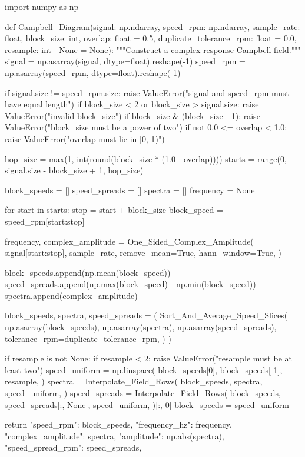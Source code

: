 \begin{python}
import numpy as np


def Campbell_Diagram(signal: np.ndarray,
                      speed_rpm: np.ndarray,
                      sample_rate: float,
                      block_size: int,
                      overlap: float = 0.5,
                      duplicate_tolerance_rpm: float = 0.0,
                      resample: int | None = None):
    """Construct a complex response Campbell field."""
    signal = np.asarray(signal, dtype=float).reshape(-1)
    speed_rpm = np.asarray(speed_rpm, dtype=float).reshape(-1)

    if signal.size != speed_rpm.size:
        raise ValueError("signal and speed_rpm must have equal length")
    if block_size < 2 or block_size > signal.size:
        raise ValueError("invalid block_size")
    if block_size & (block_size - 1):
        raise ValueError("block_size must be a power of two")
    if not 0.0 <= overlap < 1.0:
        raise ValueError("overlap must lie in [0, 1)")

    hop_size = max(1, int(round(block_size * (1.0 - overlap))))
    starts = range(0, signal.size - block_size + 1, hop_size)

    block_speeds = []
    speed_spreads = []
    spectra = []
    frequency = None

    for start in starts:
        stop = start + block_size
        block_speed = speed_rpm[start:stop]

        frequency, complex_amplitude = One_Sided_Complex_Amplitude(
            signal[start:stop],
            sample_rate,
            remove_mean=True,
            hann_window=True,
        )

        block_speeds.append(np.mean(block_speed))
        speed_spreads.append(np.max(block_speed) - np.min(block_speed))
        spectra.append(complex_amplitude)

    block_speeds, spectra, speed_spreads = (
        Sort_And_Average_Speed_Slices(
            np.asarray(block_speeds),
            np.asarray(spectra),
            np.asarray(speed_spreads),
            tolerance_rpm=duplicate_tolerance_rpm,
        )
    )

    if resample is not None:
        if resample < 2:
            raise ValueError("resample must be at least two")
        speed_uniform = np.linspace(
            block_speeds[0],
            block_speeds[-1],
            resample,
        )
        spectra = Interpolate_Field_Rows(
            block_speeds,
            spectra,
            speed_uniform,
        )
        speed_spreads = Interpolate_Field_Rows(
            block_speeds,
            speed_spreads[:, None],
            speed_uniform,
        )[:, 0]
        block_speeds = speed_uniform

    return {
        "speed_rpm": block_speeds,
        "frequency_hz": frequency,
        "complex_amplitude": spectra,
        "amplitude": np.abs(spectra),
        "speed_spread_rpm": speed_spreads,
    }
\end{python}

